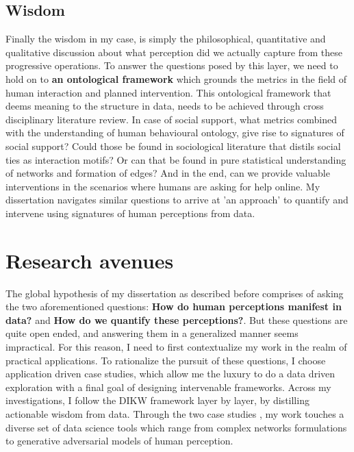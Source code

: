 \subsection{Wisdom}
Finally the wisdom in my case, is simply the philosophical, quantitative and qualitative discussion about what perception did we actually capture from these progressive operations. To answer the questions posed by this layer, we need to hold on to \textbf{an ontological framework} which grounds the metrics in the field of human interaction and planned intervention. This ontological framework that deems meaning to the structure in data, needs to be achieved through cross disciplinary literature review. In case of social support, what metrics combined with the understanding of human behavioural ontology, give rise to signatures of social support? Could those be found in sociological literature that distils social ties as interaction motifs? Or can that be found in pure statistical understanding of networks and formation of edges?  And in the end, can we provide valuable interventions in the scenarios where humans are asking for help online. My dissertation navigates similar questions to arrive at 'an approach' to quantify and intervene using signatures of human perceptions from data.

\section{Research avenues}
The global hypothesis of my dissertation as described before comprises of asking the two aforementioned questions: \textbf{How do human perceptions manifest in data?} and \textbf{How do we quantify these perceptions?}. But these questions are quite open ended, and answering them in a generalized manner seems impractical. For this reason, I need to first contextualize my work in the realm  of practical applications. 
To rationalize the pursuit of these questions, I choose application driven case studies, which allow me the luxury to do a data driven exploration with a final goal of designing intervenable frameworks.
Across my investigations, I follow the DIKW framework layer by layer, by distilling actionable wisdom from data. Through the two case studies , my work touches a diverse set of data science tools  which range from complex networks formulations to generative adversarial models of human perception.

